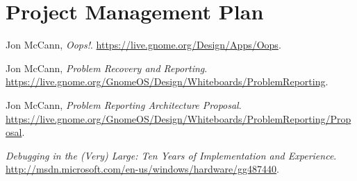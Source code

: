 \documentclass{article}
\begin{document}
\section{Project Management Plan}


\cleardoublepage
\begin{thebibliography}{9}

  Jon McCann,
  \emph{Oops!}.
  \url{https://live.gnome.org/Design/Apps/Oops}.

  Jon McCann,
  \emph{Problem Recovery and Reporting}.
  \url{https://live.gnome.org/GnomeOS/Design/Whiteboards/ProblemReporting}.

  Jon McCann,
  \emph{Problem Reporting Architecture Proposal}.
  \url{https://live.gnome.org/GnomeOS/Design/Whiteboards/ProblemReporting/Proposal}.

  \emph{Debugging in the (Very) Large: Ten Years of Implementation and Experience}.
  \url{http://msdn.microsoft.com/en-us/windows/hardware/gg487440}.

\end{thebibliography}
\end{document}
